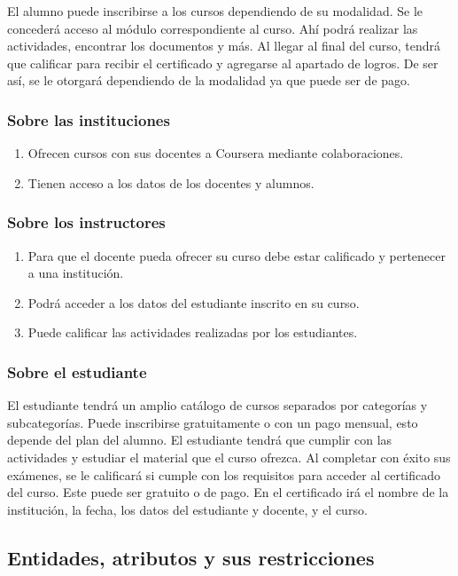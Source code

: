\documentclass[../main.tex]{subfiles}
\begin{document}
El alumno puede inscribirse a los cursos dependiendo de su modalidad.
Se le concederá acceso al módulo correspondiente al curso. Ahí podrá
realizar las actividades, encontrar los documentos y más. Al llegar al
final del curso, tendrá que calificar para recibir el certificado y
agregarse al apartado de logros. De ser así, se le otorgará
dependiendo de la modalidad ya que puede ser de pago.

\subsubsection{Sobre las instituciones}

\begin{enumerate}
  \item Ofrecen cursos con sus docentes a Coursera mediante colaboraciones.
  \item Tienen acceso a los datos de los docentes y alumnos.
\end{enumerate}

\subsubsection{Sobre los instructores}

\begin{enumerate}
  \item Para que el docente pueda ofrecer su curso debe estar calificado
        y pertenecer a una institución.
  \item Podrá acceder a los datos del estudiante inscrito en su curso.
  \item Puede calificar las actividades realizadas por los estudiantes.
\end{enumerate}

\subsubsection{Sobre el estudiante}

El estudiante tendrá un amplio catálogo de cursos separados por categorías
y subcategorías. Puede inscribirse gratuitamente o con un pago mensual,
esto depende del plan del alumno. El estudiante tendrá que cumplir con las
actividades y estudiar el material que el curso ofrezca. Al completar con
éxito sus exámenes, se le calificará si cumple con los requisitos para
acceder al certificado del curso. Este puede ser gratuito o de pago.
En el certificado irá el nombre de la institución, la fecha, los datos
del estudiante y docente, y el curso.

\subsection{Entidades, atributos y sus restricciones}


\end{document}
